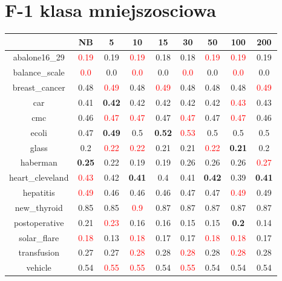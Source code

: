 \documentclass{article}%
\begin{document}
\section*{F{-}1 klasa mniejszosciowa}%
\begin{tabular}{c|cccccccc}%
\hline%
&NB&5&10&15&30&50&100&200\\%
\hline%
abalone16\_29&\textcolor{red}{ 
0.19
}&0.19&\textcolor{red}{ 
0.19
}&0.18&0.18&\textcolor{red}{ 
0.19
}&\textcolor{red}{ 
0.19
}&0.19\\%
\hline%
balance\_scale&\textcolor{red}{ 
0.0
}&0.0&\textcolor{red}{ 
0.0
}&0.0&\textcolor{red}{ 
0.0
}&0.0&\textcolor{red}{ 
0.0
}&0.0\\%
\hline%
breast\_cancer&0.48&\textcolor{red}{ 
0.49
}&0.48&\textcolor{red}{ 
0.49
}&0.48&0.48&0.48&\textcolor{red}{ 
0.49
}\\%
\hline%
car&0.41&\textbf{0.42}&0.42&0.42&0.42&0.42&\textcolor{red}{ 
0.43
}&0.43\\%
\hline%
cmc&0.46&\textcolor{red}{ 
0.47
}&\textcolor{red}{ 
0.47
}&0.47&\textcolor{red}{ 
0.47
}&0.47&\textcolor{red}{ 
0.47
}&0.46\\%
\hline%
ecoli&0.47&\textbf{0.49}&0.5&\textbf{0.52}&\textcolor{red}{ 
0.53
}&0.5&0.5&0.5\\%
\hline%
glass&0.2&\textcolor{red}{ 
0.22
}&\textcolor{red}{ 
0.22
}&0.21&0.21&\textcolor{red}{ 
0.22
}&\textbf{0.21}&0.2\\%
\hline%
haberman&\textbf{0.25}&0.22&0.19&0.19&0.26&0.26&0.26&\textcolor{red}{ 
0.27
}\\%
\hline%
heart\_cleveland&\textcolor{red}{ 
0.43
}&0.42&\textbf{0.41}&0.4&0.41&\textbf{0.42}&0.39&\textbf{0.41}\\%
\hline%
hepatitis&\textcolor{red}{ 
0.49
}&0.46&0.46&0.46&0.47&0.47&\textcolor{red}{ 
0.49
}&0.49\\%
\hline%
new\_thyroid&0.85&0.85&\textcolor{red}{ 
0.9
}&0.87&0.87&0.87&0.87&0.87\\%
\hline%
postoperative&0.21&\textcolor{red}{ 
0.23
}&0.16&0.16&0.15&0.15&\textbf{0.2}&0.14\\%
\hline%
solar\_flare&\textcolor{red}{ 
0.18
}&0.13&\textcolor{red}{ 
0.18
}&0.17&0.17&\textcolor{red}{ 
0.18
}&\textcolor{red}{ 
0.18
}&0.17\\%
\hline%
transfusion&0.27&0.27&\textcolor{red}{ 
0.28
}&0.28&\textcolor{red}{ 
0.28
}&0.28&\textcolor{red}{ 
0.28
}&0.28\\%
\hline%
vehicle&0.54&\textcolor{red}{ 
0.55
}&\textcolor{red}{ 
0.55
}&0.54&\textcolor{red}{ 
0.55
}&0.54&0.54&0.54\\%

\end{tabular}
\end{document}
